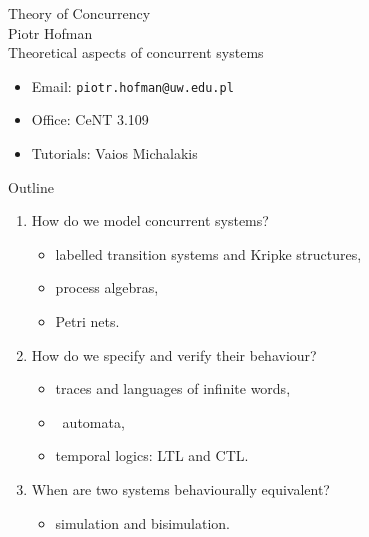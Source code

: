 \documentclass{beamer}
\renewcommand{\Margines}[1]{\noindent\begin{center}\begin{minipage}[t]{0.93\textwidth}\footnotesize #1\end{minipage}\end{center}}
\begin{document}
\begin{frame}{ }
\Margines{
\begin{center}
  {\huge Theory of Concurrency}\\[0.4cm]
  {\Large Piotr Hofman}\\[0.15cm]
  {\small Theoretical aspects of concurrent systems}
\end{center}
\vspace{0.7cm}
\begin{itemize}
  \item Email: \texttt{piotr.hofman@uw.edu.pl}
  \item Office: CeNT 3.109
  \item Tutorials: Vaios Michalakis
\end{itemize}
}
\end{frame}

\begin{frame}{Outline}
\Margines{
\begin{enumerate}
  \item How do we model concurrent systems?
  \begin{itemize}
    \item labelled transition systems and Kripke structures,
    \item process algebras,
    \item Petri nets.
  \end{itemize}
  \item How do we specify and verify their behaviour?
  \begin{itemize}
    \item traces and languages of infinite words,
    \item \Buchi\ automata,
    \item temporal logics: LTL and CTL.
  \end{itemize}
  \item When are two systems behaviourally equivalent?
  \begin{itemize}
    \item simulation and bisimulation.
  \end{itemize}
\end{enumerate}
}
\end{frame}
\end{document}
